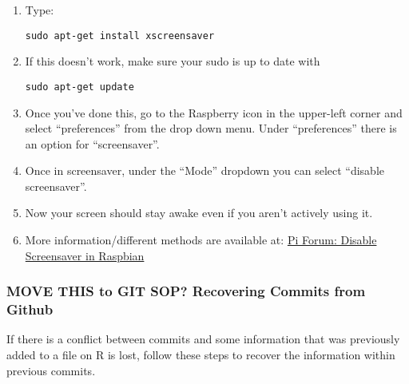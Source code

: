 \documentclass{article}\usepackage[]{graphicx}\usepackage[]{color}
\begin{document}
\begin{enumerate}

\item Type: 

\begin{lstlisting}
sudo apt-get install xscreensaver
\end{lstlisting}

\item If this doesn't work, make sure your sudo is up to date with 
\begin{lstlisting}
sudo apt-get update
\end{lstlisting}

\item Once you've done this, go to the Raspberry icon in the upper-left corner and select ``preferences'' from the drop down menu.  Under ``preferences'' there is an option for ``screensaver''.

\item Once in screensaver, under the ``Mode'' dropdown you can select ``disable screensaver''.

\item Now your screen should stay awake even if you aren't actively using it.

\item More information/different methods are available at: \href{https://www.raspberrypi.org/forums/viewtopic.php?f=91&t=57552}{Pi Forum:  Disable Screensaver in Raspbian}

\end{enumerate}



\subsubsection{MOVE THIS to GIT SOP? Recovering Commits from Github}


If there is a conflict between commits and some information that was previously added to a file on R is lost, follow these steps to recover the information within previous commits.
\end{document}
